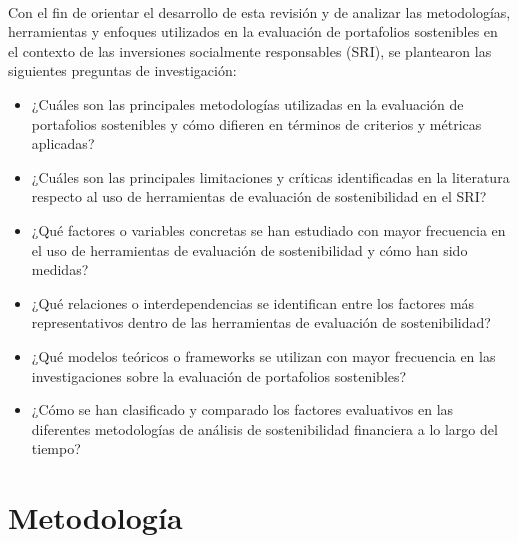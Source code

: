 \documentclass[12pt]{article}
\begin{document}
\\
Con el fin de orientar el desarrollo de esta revisi\'on y de analizar las metodolog\'ias, herramientas y enfoques utilizados en la evaluaci\'on de portafolios sostenibles en el contexto de las inversiones socialmente responsables (SRI), se plantearon las siguientes preguntas de investigaci\'on:\\

\begin{itemize}
    \item ¿Cu\'ales son las principales metodolog\'ias utilizadas en la evaluaci\'on de portafolios sostenibles y c\'omo difieren en t\'erminos de criterios y m\'etricas aplicadas?
    \item ¿Cu\'ales son las principales limitaciones y cr\'iticas identificadas en la literatura respecto al uso de herramientas de evaluaci\'on de sostenibilidad en el SRI?
    \item ¿Qu\'e factores o variables concretas se han estudiado con mayor frecuencia en el uso de herramientas de evaluación de sostenibilidad y c\'omo han sido medidas?
    \item ¿Qu\'e relaciones o interdependencias se identifican entre los factores m\'as representativos dentro de las herramientas de evaluaci\'on de sostenibilidad?
    \item ¿Qu\'e modelos te\'oricos o frameworks se utilizan con mayor frecuencia en las investigaciones sobre la evaluaci\'on de portafolios sostenibles?
    \item ¿C\'omo se han clasificado y comparado los factores evaluativos en las diferentes metodolog\'ias de an\'alisis de sostenibilidad financiera a lo largo del tiempo? 
\end{itemize}

\section{Metodolog\'ia}
\end{document}
